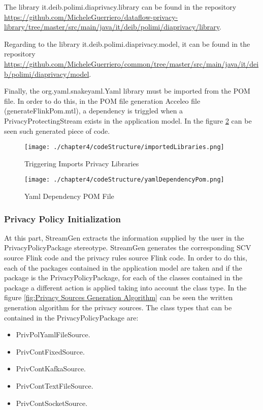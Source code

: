 The library it.deib.polimi.diaprivacy.library can be found in the repository \url{https://github.com/MicheleGuerriero/dataflow-privacy-library/tree/master/src/main/java/it/deib/polimi/diaprivacy/library}.

Regarding to the library it.deib.polimi.diaprivacy.model, it can be found in the repository \url{https://github.com/MicheleGuerriero/common/tree/master/src/main/java/it/deib/polimi/diaprivacy/model}.

Finally, the org.yaml.snakeyaml.Yaml library must be imported from the POM file. In order to do this, in the POM file generation Acceleo file (generateFlinkPom.mtl), a dependency is triggled when a PrivacyProtectingStream exists in the application model. In the figure \ref{fig:Yaml Dependency POM File} can be seen such generated piece of code.

\begin{figure}
\centering
{\texttt{[image: ./chapter4/codeStructure/importedLibraries.png]}}
\caption{Triggering Imports Privacy Libraries}
\label{fig:Triggering Imports Privacy Libraries}
\end{figure}

\begin{figure}
\centering
{\texttt{[image: ./chapter4/codeStructure/yamlDependencyPom.png]}}
\caption{Yaml Dependency POM File}
\label{fig:Yaml Dependency POM File}
\end{figure}

\subsubsection{Privacy Policy Initialization}

At this part, StreamGen extracts the information supplied by the user in the PrivacyPolicyPackage stereotype. StreamGen generates the corresponding SCV source Flink code and the privacy rules source Flink code. In order to do this, each of the packages contained in the application model are taken and if the package is the PrivacyPolicyPackage, for each of the classes contained in the package a different action is applied taking into account the class type. In the figure \ref{fig:Privacy Sources Generation Algorithm} can be seen the written generation algorithm for the privacy sources. The class types that can be contained in the PrivacyPolicyPackage are:

\begin{itemize}
\item PrivPolYamlFileSource.
\item PrivContFixedSource.
\item PrivContKafkaSource.
\item PrivContTextFileSource.
\item PrivContSocketSource.
\end{itemize}

